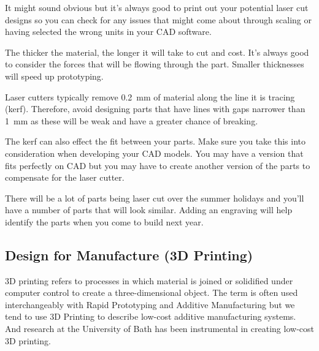 It might sound obvious but it's always good to print out your potential laser cut designs so you can check for any issues that might come about through scaling or having selected the wrong units in your CAD software.

The thicker the material, the longer it will take to cut and cost. It's always good to consider the forces that will be flowing through the part. Smaller thicknesses will speed up prototyping.

Laser cutters typically remove \SI{0.2}{\milli\metre} of material along the line it is tracing (kerf). Therefore, avoid designing parts that have lines with gaps narrower than \SI{1}{\milli\metre} as these will be weak and have a greater chance of breaking.

The kerf can also effect the fit between your parts. Make sure you take this into consideration when developing your CAD models. You may have a version that fits perfectly on CAD but you may have to create another version of the parts to compensate for the laser cutter.

There will be a lot of parts being laser cut over the summer holidays and you'll have a number of parts that will look similar. Adding an engraving will help identify the parts when you come to build next year.


\subsection{Design for Manufacture (3D Printing)}

3D printing refers to processes in which material is joined or solidified under computer control to create a three-dimensional object. The term is often used interchangeably with Rapid Prototyping and Additive Manufacturing but we tend to use 3D Printing to describe low-cost additive manufacturing systems. And research at the University of Bath has been instrumental in creating low-cost 3D printing.


